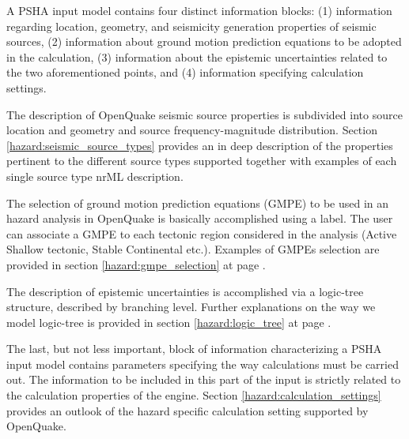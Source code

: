 A PSHA input model contains four distinct information blocks: (1) information 
regarding location, geometry, and seismicity generation properties of seismic
sources, (2) information about ground motion prediction equations to be 
adopted in the calculation, (3) information about the epistemic uncertainties 
related to the two aforementioned points, and (4) information specifying 
calculation settings.

The description of OpenQuake seismic source properties is subdivided into 
source location and geometry and source frequency-magnitude distribution. 
Section \ref{hazard:seismic_source_types} provides an in deep description of 
the properties pertinent to the different source types supported together 
with examples of each single source type nrML description. 

The selection of ground motion prediction equations (GMPE) to be used in an 
hazard analysis in OpenQuake is basically accomplished using a label.  
The user can associate a GMPE to each tectonic region considered in the 
analysis (Active Shallow tectonic, Stable Continental etc.). Examples of 
GMPEs selection are provided in section \ref{hazard:gmpe_selection} at page 
\pageref{hazard:gmpe_selection}.

The description of epistemic uncertainties is accomplished via a logic-tree 
structure, described by branching level. Further explanations on the way we 
model logic-tree is provided in section \ref{hazard:logic_tree} at page 
\pageref{hazard:logic_tree}. 

The last, but not less important, block of information characterizing a PSHA 
input model contains parameters specifying the way calculations must be 
carried out. The information to be included in this part of the input is 
strictly related to the calculation properties of the engine. Section 
\ref{hazard:calculation_settings} provides an outlook of the hazard specific 
calculation setting supported by OpenQuake. 
%
